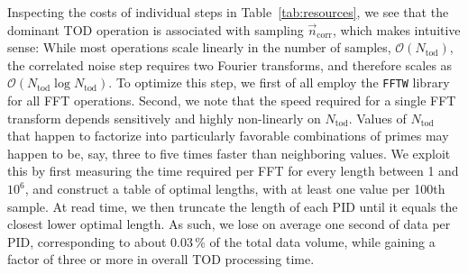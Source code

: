 \documentclass[twocolumn]{aa}
\newcommand{\n}[0]{\vec{n}}
\begin{document}
Inspecting the costs of individual steps in Table~\ref{tab:resources},
we see that the dominant TOD operation is associated with sampling
$\n_{\mathrm{corr}}$, which makes intuitive sense: While most
operations scale linearly in the number of samples,
$\mathcal{O}(N_{\mathrm{tod}})$, the correlated noise step requires
two Fourier transforms, and therefore scales as
$\mathcal{O}(N_{\mathrm{tod}}\log N_{\mathrm{tod}})$. To optimize this
step, we first of all employ the \texttt{FFTW} library \citep{FFTW05} for all
FFT operations. Second, we note that the speed required for a single
FFT transform depends sensitively and highly non-linearly on
$N_{\mathrm{tod}}$. Values of $N_{\mathrm{tod}}$ that happen to
factorize into particularly favorable combinations of primes may
happen to be, say, three to five times faster than neighboring
values. We exploit this by first measuring the time required per FFT
for every length between 1 and $10^6$, and construct a table of
optimal lengths, with at least one value per 100th sample. At read
time, we then truncate the length of each PID until it equals the
closest lower optimal length. As such, we lose on average one second of
data per PID, corresponding to about 0.03\,\% of the total data
volume, while gaining a factor of three or more in overall TOD
processing time.
\end{document}
